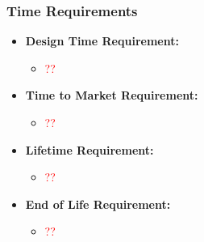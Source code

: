 \documentclass[a4paper,12pt]{article}
\begin{document}
\subsubsection{Time Requirements}
\begin{itemize}
    \item \textbf{Design Time Requirement:}
    \begin{itemize}
        \item \textcolor{red}{??}
    \end{itemize}
    \item \textbf{Time to Market Requirement:}
    \begin{itemize}
        \item \textcolor{red}{??}
    \end{itemize}
    \item \textbf{Lifetime Requirement:}
    \begin{itemize}
        \item \textcolor{red}{??}
    \end{itemize}
    \item \textbf{End of Life Requirement:}
    \begin{itemize}
        \item \textcolor{red}{??}
    \end{itemize}
\end{itemize}
\end{document}
